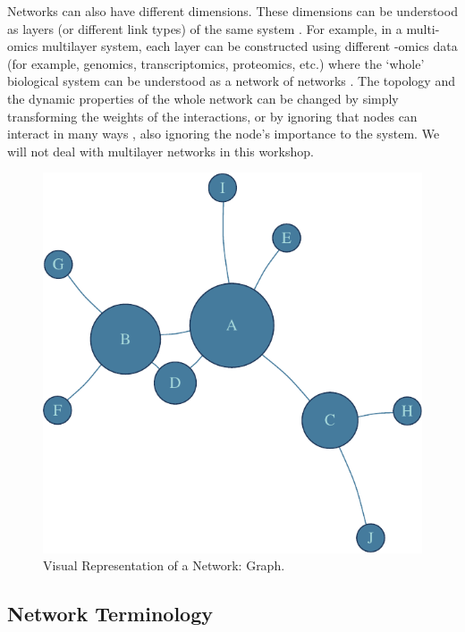 \documentclass[
]{book}
\begin{document}
Networks can also have different dimensions. These dimensions can be understood as layers (or different link types) of the same system \citep{Kurant2006LayeredNetworks, Kivela2014MultilayerNetworks}. For example, in a multi-omics multilayer system, each layer can be constructed using different -omics data (for example, genomics, transcriptomics, proteomics, etc.) where the `whole' biological system can be understood as a network of networks \citep{DeDomenico2017}. The topology and the dynamic properties of the whole network can be changed by simply transforming the weights of the interactions, or by ignoring that nodes can interact in many ways \citep{Mucha2010CommunityNetworks, Radicchi2013AbruptNetworks}, also ignoring the node's importance to the system. We will not deal with multilayer networks in this workshop.

\begin{figure}

{\centering \includegraphics[width=0.8\linewidth]{NetMed_files/figure-latex/GRAPH-1} 

}

\caption{Visual Representation of a Network: Graph.}\label{fig:GRAPH}
\end{figure}

\hypertarget{network-terminology}{%
\subsection{Network Terminology}\label{network-terminology}}
\end{document}
